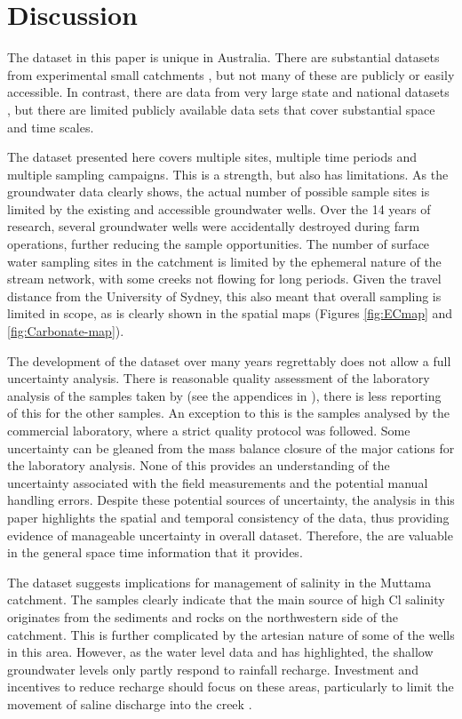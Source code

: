 \documentclass[, manuscript]{copernicus}
\begin{document}
\section{Discussion}

The dataset in this paper is unique in Australia. There are substantial
datasets from experimental small catchments
\citep[i.e.][]{Hughes2007, Summerell2006}, but not many of these are
publicly or easily accessible. In contrast, there are data from very
large state and national datasets \citep[i.e.][]{Jolly2001}, but there
are limited publicly available data sets that cover substantial space
and time scales.

The dataset presented here covers multiple sites, multiple time periods
and multiple sampling campaigns. This is a strength, but also has
limitations. As the groundwater data clearly shows, the actual number of
possible sample sites is limited by the existing and accessible
groundwater wells. Over the 14 years of research, several groundwater
wells were accidentally destroyed during farm operations, further
reducing the sample opportunities. The number of surface water sampling
sites in the catchment is limited by the ephemeral nature of the stream
network, with some creeks not flowing for long periods. Given the travel
distance from the University of Sydney, this also meant that overall
sampling is limited in scope, as is clearly shown in the spatial maps
(Figures \ref{fig:ECmap} and \ref{fig:Carbonate-map}).

The development of the dataset over many years regrettably does not
allow a full uncertainty analysis. There is reasonable quality
assessment of the laboratory analysis of the samples taken by
\citet{Akter2018} (see the appendices in \citet{Akter2018}), there is
less reporting of this for the other samples. An exception to this is
the samples analysed by the commercial laboratory, where a strict
quality protocol was followed. Some uncertainty can be gleaned from the
mass balance closure of the major cations for the laboratory analysis.
None of this provides an understanding of the uncertainty associated
with the field measurements and the potential manual handling errors.
Despite these potential sources of uncertainty, the analysis in this
paper highlights the spatial and temporal consistency of the data, thus
providing evidence of manageable uncertainty in overall dataset.
Therefore, the are valuable in the general space time information that
it provides.

The dataset suggests implications for management of salinity in the
Muttama catchment. The samples clearly indicate that the main source of
high Cl salinity originates from the sediments and rocks on the
northwestern side of the catchment. This is further complicated by the
artesian nature of some of the wells in this area. However, as the water
level data and \citet{Akter2018} has highlighted, the shallow
groundwater levels only partly respond to rainfall recharge. Investment
and incentives to reduce recharge should focus on these areas,
particularly to limit the movement of saline discharge into the creek
\citep{Akter2018}.
\end{document}
